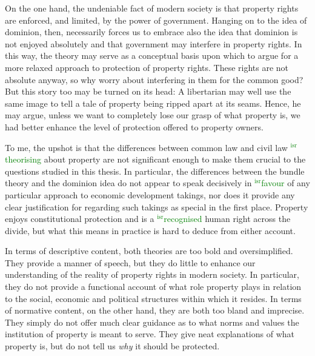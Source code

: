 \documentclass[12pt,a4paper]{book} %
\newcommand{\isr}[1]{\textcolor{green}{$^{\textrm{isr}}${#1}}}
\begin{document}
On the one hand, the undeniable fact of modern society is that property rights are enforced, and limited, by the power of government. Hanging on to the idea of dominion, then, necessarily forces us to embrace also the idea that dominion is not enjoyed absolutely and that government may interfere in property rights. In this way, the theory may serve as a conceptual basis upon which to argue for a more relaxed approach to protection of property rights. These rights are not absolute anyway, so why worry about interfering in them for the common good? But this story too may be turned on its head: A libertarian may well use the same image to tell a tale of property being ripped apart at its seams. Hence, he may argue, unless we want to completely lose our grasp of what property is, we had better enhance the level of protection offered to property owners.

To me, the upshot is that the differences between common law and civil law \isr{theorising} about property are not significant enough to make them crucial to the questions studied in this thesis. In particular, the differences between the bundle theory and the dominion idea do not appear to speak decisively in \isr{favour} of any particular approach to economic development takings, nor does it provide any clear justification for regarding such takings as special in the first place. Property enjoys constitutional protection and is a \isr{recognised} human right across the divide, but what this means in practice is hard to deduce from either account.

In terms of descriptive content, both theories are too bold and oversimplified. They provide a manner of speech, but they do little to enhance our understanding of the reality of property rights in modern society. In particular, they do not provide a functional account of what role property plays in relation to the social, economic and political structures within which it resides. In terms of normative content, on the other hand, they are both too bland and imprecise. They simply do not offer much clear guidance as to what norms and values the institution of property is meant to serve. They give neat explanations of what property is, but do not tell us {\it why} it should be protected. 
\end{document}
